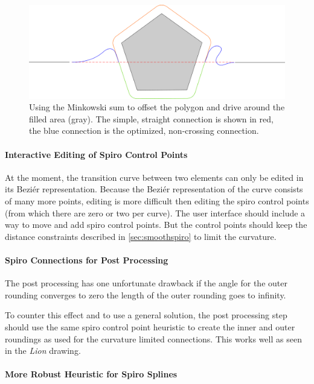 \begin{figure}
\includegraphics[width=\textwidth]{images/conclusion/minkowski_crossing_avoidance.pdf}
\caption{Using the Minkowski sum to offset the polygon and drive around the filled area (gray). The simple, straight connection is shown in red, the blue connection is the optimized, non-crossing connection.}\label{fig:super_conn}
\end{figure}

\paragraph{Interactive Editing of Spiro Control Points} At the moment, the transition curve between two elements can only be edited in its Beziér representation. Because the Beziér representation of the curve consists of many more points, editing is more difficult then editing the spiro control points (from which there are zero or two per curve). The user interface should include a way to move and add spiro control points. But the control points should keep the distance constraints described in \autoref{sec:smoothspiro} to limit the curvature.

\paragraph{Spiro Connections for Post Processing}

The post processing has one unfortunate drawback if the angle for the outer rounding converges to zero the length of the outer rounding goes to infinity.

To counter this effect and to use a general solution, the post processing step should use the same spiro control point heuristic to create the inner and outer roundings as used for the curvature limited connections. This works well as seen in the \textit{Lion} drawing.

\paragraph{More Robust Heuristic for Spiro Splines}

